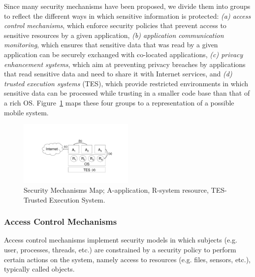 Since many security mechanisms have been proposed, we divide them into groups to reflect the different ways in which sensitive information is protected: \emph{(a) access control mechanisms}, which enforce security policies that prevent access to sensitive resources by a given application, \emph{(b) application communication monitoring}, which ensures that sensitive data that was read by a given application can be securely exchanged with co-located applications, \emph{(c) privacy enhancement systems}, which aim at preventing privacy breaches by applications that read sensitive data and need to share it with Internet services, and \emph{(d) trusted execution systems} (TES), which provide restricted environments in which sensitive data can be processed while trusting in a smaller code base than that of a rich OS. Figure~\ref{fig:relwork} maps these four groups to a representation of a possible mobile system.

\begin{figure}[t!]
	\centering
	\includegraphics[width=0.50\textwidth]{img/relwork.pdf}
	\caption{Security Mechanisms Map; A-application, R-system resource, TES-Trusted Execution System.}
	\label{fig:relwork}
\end{figure}

\subsubsection{Access Control Mechanisms}
\label{sec:accesscontrol}

Access control mechanisms implement security models in which subjects (e.g. user, processes, threads, etc.) are constrained by a security policy to perform certain actions on the system, namely access to resources (e.g. files, sensors, etc.), typically called objects.

